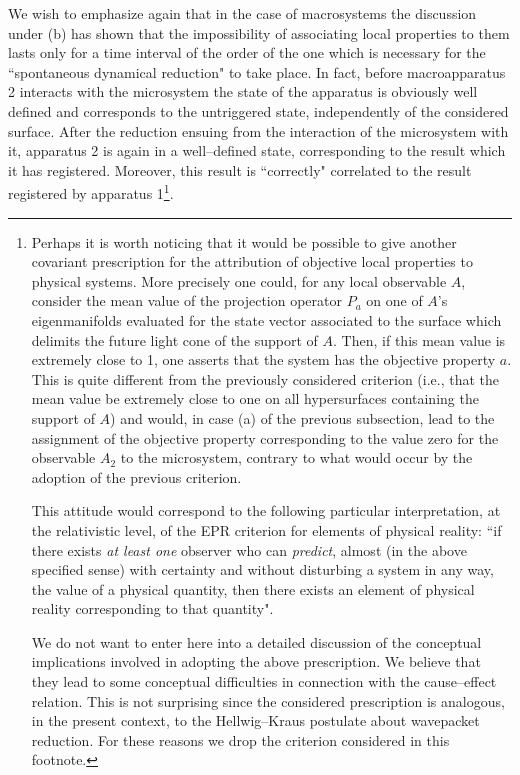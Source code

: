 \documentclass[10pt,a4paper]{article}
\begin{document}
We wish to emphasize again that in the case of macrosystems the
discussion under (b) has shown that the impossibility of
associating local properties to them lasts only for a time
interval of the order of the one which is necessary for the
``spontaneous dynamical reduction" to take place. In fact, before
macroapparatus 2 interacts with the microsystem the state of the
apparatus is obviously well defined and corresponds to the
untriggered state, independently of the considered surface. After
the reduction ensuing from the interaction of the microsystem with
it, apparatus 2 is again in a well--defined state, corresponding
to the result which it has registered. Moreover, this result is
``correctly" correlated to the result registered by apparatus
1\footnote{Perhaps it is worth noticing that it would be possible
to give another covariant prescription for the attribution of
objective local properties to physical systems. More precisely one
could, for any local observable $A$, consider the mean value of
the projection operator $P_{a}$ on one of $A$'s eigenmanifolds
evaluated for the state vector associated to the surface which
delimits the future light cone of the support of $A$. Then, if
this mean value is extremely close to 1, one asserts that the
system has the objective property $a$. This is quite different
from the previously considered criterion (i.e., that the mean
value be extremely close to one on all hypersurfaces containing
the support of $A$) and would, in case (a) of the previous
subsection, lead to the assignment of the objective property
corresponding to the value zero for the observable $A_{2}$ to the
microsystem, contrary to what would occur by the adoption of the
previous criterion.

This attitude would correspond to the following particular
interpretation, at the relativistic level, of the EPR criterion
for elements of physical reality: ``if there exists {\it at least
one} observer who can {\it predict}, almost (in the above
specified sense) with certainty and without disturbing a system in
any way, the value of a physical quantity, then there exists an
element of physical reality corresponding to that quantity".

We do not want to enter here into a detailed discussion of the
conceptual implications involved in adopting the above
prescription. We believe that they lead to some conceptual
difficulties in connection with the cause--effect relation. This
is not surprising since the considered prescription is analogous,
in the present context, to the Hellwig--Kraus \cite{hkd} postulate
about wavepacket reduction. For these reasons we drop the
criterion considered in this footnote.}.
\end{document}
